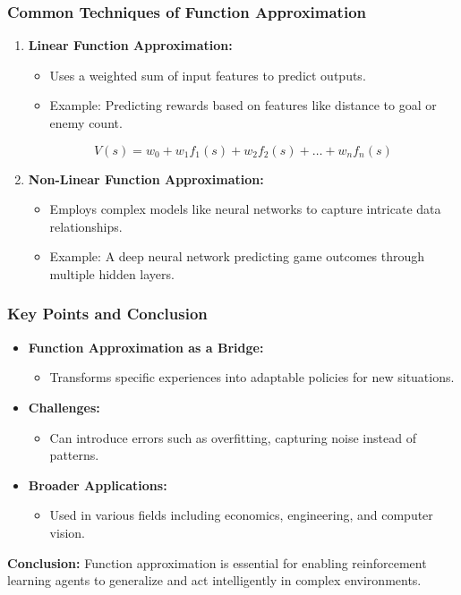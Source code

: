 \documentclass[aspectratio=169]{beamer}
\begin{document}
\begin{frame}[fragile]
    \frametitle{Common Techniques of Function Approximation}
    \begin{enumerate}
        \item \textbf{Linear Function Approximation:}
        \begin{itemize}
            \item Uses a weighted sum of input features to predict outputs.
            \item Example: Predicting rewards based on features like distance to goal or enemy count.
        \end{itemize}
        \begin{equation}
            V(s) = w_0 + w_1 f_1(s) + w_2 f_2(s) + \ldots + w_n f_n(s)
        \end{equation}

        \item \textbf{Non-Linear Function Approximation:}
        \begin{itemize}
            \item Employs complex models like neural networks to capture intricate data relationships.
            \item Example: A deep neural network predicting game outcomes through multiple hidden layers.
        \end{itemize}
    \end{enumerate}
\end{frame}

\begin{frame}[fragile]
    \frametitle{Key Points and Conclusion}
    \begin{itemize}
        \item \textbf{Function Approximation as a Bridge:}
        \begin{itemize}
            \item Transforms specific experiences into adaptable policies for new situations.
        \end{itemize}
        
        \item \textbf{Challenges:}
        \begin{itemize}
            \item Can introduce errors such as overfitting, capturing noise instead of patterns.
        \end{itemize}
        
        \item \textbf{Broader Applications:}
        \begin{itemize}
            \item Used in various fields including economics, engineering, and computer vision.
        \end{itemize}
    \end{itemize}

    \textbf{Conclusion:} Function approximation is essential for enabling reinforcement learning agents to generalize and act intelligently in complex environments.
\end{frame}
\end{document}
